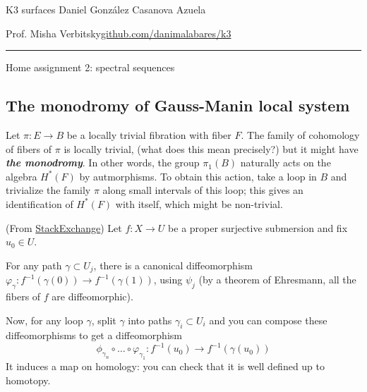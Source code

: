 

\usepackage[style=authortitle-terse,backend=bibtex]{biblatex}


\setcounter{secnumdepth}{0}



\begin{minipage}{\textwidth}
	\begin{minipage}{1\textwidth}
		K3 surfaces \hfill Daniel González Casanova Azuela
		
		{\small Prof. Misha Verbitsky\hfill\href{https://github.com/danimalabares/k3}{github.com/danimalabares/k3}}
	\end{minipage}
\end{minipage}\vspace{.2cm}\hrule

\vspace{10pt}
{\huge Home assignment 2: spectral sequences}

\setcounter{section}{2}
\subsection{The monodromy of Gauss-Manin local system}

\begin{manualdef}{2.1}
	Let $\pi:E\to B$ be a locally trivial fibration with fiber $F$. The family of cohomology of fibers of $\pi$ is locally trivial, {\color{magenta}(what does this mean precisely?)} but it might have \textit{\textbf{the monodromy}}. In other words, the group $\pi_{1}(B)$ naturally acts on the algebra $H^{*}(F)$ by autmorphisms. To obtain this action, take a loop in $B$ and trivialize the family $ \pi$ along small intervals of this loop; this gives an identification of $H^{*}(F)$ with itself, which might be non-trivial.
\end{manualdef}

\begin{remark}
	(From \href{https://math.stackexchange.com/questions/2845794/monodromy-on-cohomology}{StackExchange}) Let $f:X\to U$ be a proper surjective submersion and fix $u_0\in U$.

	For any path $\gamma \subset U_j$, there is a canonical diffeomorphism $\varphi_\gamma:f^{-1}(\gamma(0))\to f^{-1}(\gamma(1))$, using $\psi_j$ (by a theorem of Ehresmann, all the fibers of $f$ are diffeomorphic).

	Now, for any loop $\gamma$, split $\gamma$ into paths $\gamma_i\subset U_i$ and you can compose these diffeomorphisms to get a diffeomorphism
	 \[\phi_{\gamma_n}\circ \ldots\circ \varphi_{\gamma_1}:f^{-1}(u_0)\to f^{-1}(\gamma(u_0))\]
	 It induces a map on homology: you can check that it is well defined up to homotopy.
\end{remark}

